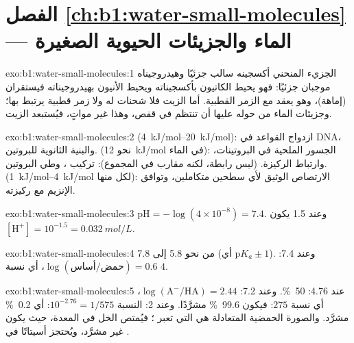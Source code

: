 \section*{الفصل \ref{ch:b1:water-small-molecules} --- الماء والجزيئات الحيوية الصغيرة}

\begin{solution}{exo:b1:water-small-molecules:1}
الجزيء المنحني  أكسجينه سالب جزئيًا وهيدروجيناه موجبان
جزئيًا: فهو يحيط الكاتيون بأكسجيناته ويحيط الأنيون بهيدروجيناته
فيستقران (إماهة)، وهو يعقد  مع الزمر القطبية. أما
الزيت فلا شحنات له ولا زمر قطبية يرتبط بها؛ وجزيئات الماء من حوله
عليها أن تنتظم في قفص، وهذا غير مواتٍ، فيُستبعد الزيت.
\end{solution}

\begin{solution}{exo:b1:water-small-molecules:2}
 (\qtyrange{4}{20}{kJ/mol}): ازدواج القواعد في DNA،
والبنية الثانوية للبروتين.  (نحو \qty{12}{kJ/mol} في
الماء): الجسور الملحية في البروتينات، وارتباط الركيزة.  (ليس رابطة، لكنه مقارب في المجموع): تركيب ، وطي
البروتين.  (\qtyrange{1}{4}{kJ/mol} لكل منها): الارتصاص
الوثيق لأي سطحين متكاملين، وتوافق الإنزيم مع ركيزته.
\end{solution}

\begin{solution}{exo:b1:water-small-molecules:3}
$\mathrm{pH} = -\log(4\times 10^{-8}) = 7.4$. وعند  1.5 يكون
$[\mathrm{H^+}] = 10^{-1.5} = \qty{0.032}{mol/L}$.
\end{solution}

\begin{solution}{exo:b1:water-small-molecules:4}
من نحو 5.8 إلى 7.8 (أي p$K_a \pm 1$). وعند 7.4:
$\log(\text{أساس}/\text{حمض})
= 0.6$، أي نسبة $4$.
\end{solution}

\begin{solution}{exo:b1:water-small-molecules:5}
عند  4.76: \qty{50}{\%}. وعند 7.2:
$\log(\mathrm{A^-}/\mathrm{HA}) =
2.44$، أي نسبة $275$: فيكون
\qty{99.6}{\%} مشرَّدًا. وعند  2: النسبة $10^{-2.76} =
1/575$: أي
\qty{0.2}{\%} مشرَّد. والصورة الحمضية المتعادلة هي التي تعبر ؛ فيُمتص  الخل في المعدة، حيث يكون غير مشرَّد،
ويُحتجز أسيتاتًا في .
\end{solution}

